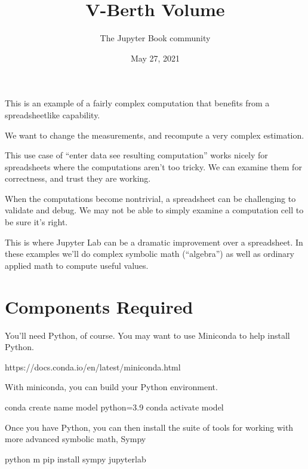 \documentclass[letterpaper,10pt,english]{sphinxmanual}
\title{V-Berth Volume}
\date{May 27, 2021}
\author{The Jupyter Book community}
\begin{document}
\pagestyle{empty}
\sphinxmaketitle
\pagestyle{plain}
\sphinxtableofcontents
\pagestyle{normal}
\label{\detokenize{README::doc}}


\sphinxAtStartPar
This is an example of a fairly complex computation that benefits from a spreadsheet\sphinxhyphen{}like
capability.

\sphinxAtStartPar
We want to change the measurements, and recompute a very complex estimation.

\sphinxAtStartPar
This use case of “enter data \textendash{} see resulting computation” works nicely for spreadsheets
where the computations aren’t too tricky. We can examine them for correctness, and trust
they are working.

\sphinxAtStartPar
When the computations become non\sphinxhyphen{}trivial, a spreadsheet can be challenging to
validate and debug.
We may not be able to simply examine a computation cell to be sure it’s right.

\sphinxAtStartPar
This is where Jupyter Lab can be a dramatic improvement over a spreadsheet.
In these examples we’ll do complex symbolic math (“algebra”) as well as ordinary
applied math to compute useful values.


\chapter{Components Required}
\label{\detokenize{README:components-required}}
\sphinxAtStartPar
You’ll need Python, of course. You may want to use Miniconda to help install Python.

\begin{sphinxVerbatim}[commandchars=\\\{\}]
https://docs.conda.io/en/latest/miniconda.html
\end{sphinxVerbatim}

\sphinxAtStartPar
With miniconda, you can build your Python environment.

\begin{sphinxVerbatim}[commandchars=\\\{\}]
conda create \PYGZhy{}\PYGZhy{}name model python=3.9
conda activate model
\end{sphinxVerbatim}

\sphinxAtStartPar
Once you have Python, you can then install the suite of tools for working
with more advanced symbolic math, Sympy 

\begin{sphinxVerbatim}[commandchars=\\\{\}]
python \PYGZhy{}m pip install sympy jupyter\PYGZhy{}lab
\end{sphinxVerbatim}
\end{document}
